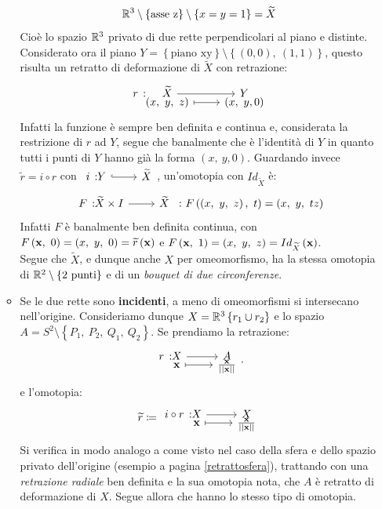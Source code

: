 \begin{examples}
\begin{enumerate}
\begin{itemize}
			\begin{equation*}
				\mathbb{R}^3\setminus\left\{\text{asse z}\right\}\setminus\left\{x=y=1\right\}=\widetilde{X}
			\end{equation*}
		Cioè lo spazio $\mathbb{R}^3$ privato di due rette perpendicolari al piano e distinte.\\
			Considerato ora il piano $Y=\left\{\text{piano xy}\right\}\setminus\left\{\left(0,0\right),\ \left(1,1\right)\right\}$, questo risulta un retratto di deformazione di $\widetilde{X}$ con retrazione:
			\begin{equation*}
				\funztot{r}{\widetilde{X}}{Y}{\left(x,\ y,\ z\right)}{\left(x,\ y, 0\right)}
			\end{equation*}
		Infatti la funzione è sempre ben definita e continua e, considerata la restrizione di $r$ ad $Y$, segue che banalmente che è l'identità di $Y$ in quanto tutti i punti di $Y$ hanno già la forma $\left(x,\ y, 0\right)$. Guardando invece $\widetilde{r}=i\circ r$ con $\incl{i}{Y}{\widetilde{X}}$, un'omotopia con $Id_{\widetilde{X}}$ è:
		\begin{equation*}
			\funz{F}{\widetilde{X}\times I}{\widetilde{X}}\ \colon \mvf{F}{\left(x,\ y,\ z\right)}{t}=\left(x,\ y,\ tz\right)
		\end{equation*}
		Infatti $F$ è banalmente ben definita continua, con $\mvf{F}{\mathbf{x}}{0}=\left(x,\ y,\ 0\right)=\widetilde{r}\left(\mathbf{x}\right)$ e $\mvf{F}{\mathbf{x}}{1}=\left(x,\ y,\ z\right)=Id_{\widetilde{X}}\left(\mathbf{x}\right)$.\\
		Segue che $\widetilde{X}$, e dunque anche $X$ per omeomorfismo, ha la stessa omotopia di $\mathbb{R}^2\setminus\left\{2\text{ punti}\right\}$ e di un \textit{bouquet di due circonferenze}.
		\item Se le due rette sono \textbf{incidenti}, a meno di omeomorfismi si intersecano nell'origine. Consideriamo dunque $X=\mathbb{R}^3\left\{r_1\cup r_2\right\}$ e lo spazio $A=S^2\setminus\left\{P_1,\ P_2,\ Q_1,\ Q_2\right\}$. Se prendiamo la retrazione:
		\begin{equation*}
			\funztot{r}{X}{A}{\mathbf{x}}{\frac{\mathbf{x}}{\labs \mathbf{x}\rabs}}.
		\end{equation*}
		e l'omotopia:
		\begin{equation*}
			\widetilde{r}\coloneqq\funztot{ i\circ r}{X}{X}{\mathbf{x}}{\frac{\mathbf{x}}{\labs \mathbf{x}\rabs}}
		\end{equation*}
	Si verifica in modo analogo a come visto nel caso della sfera e dello spazio privato dell'origine (esempio a pagina \ref{retrattosfera}), trattando con una \textit{retrazione radiale} ben definita e la sua omotopia nota, che $A$ è retratto di deformazione di $X$. Segue allora che hanno lo stesso tipo di omotopia.
		\end{itemize}
	\end{enumerate}
	\vspace{-3mm}
\end{examples}
